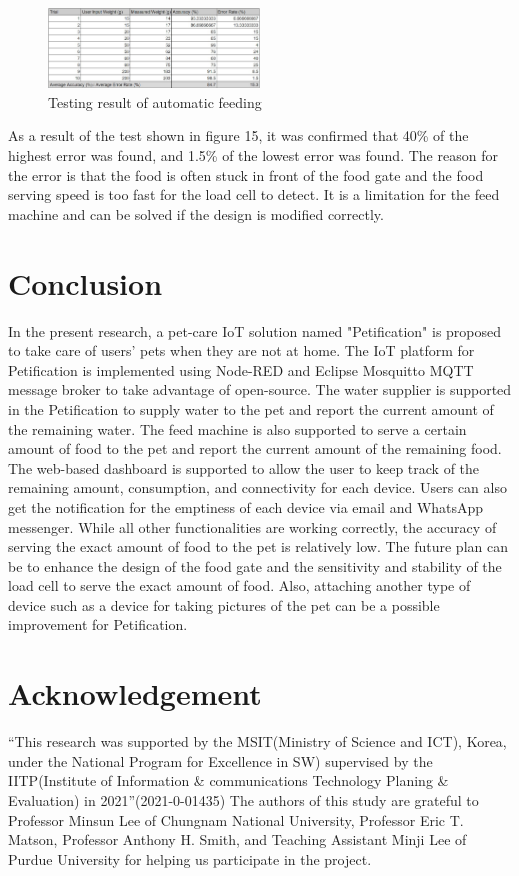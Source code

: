 \documentclass[conference]{IEEEtran}
\begin{document}
\begin{figure}[htbp]
\centerline{\includegraphics[width=0.5\textwidth]{./images/Feeding_sheet.jpg}}
\caption{Testing result of automatic feeding}
\label{fig}
\end{figure}

As a result of the test shown in figure 15, it was confirmed that 40\% of the highest error was found, and 1.5\% of the lowest error was found.
The reason for the error is that the food is often stuck in front of the food gate and the food serving speed is too fast for the load cell to detect.
It is a limitation for the feed machine and can be solved if the design is modified correctly.

\section{Conclusion}
In the present research, a pet-care IoT solution named "Petification" is proposed to take care of users’ pets when they are not at home.
The IoT platform for Petification is implemented using Node-RED and Eclipse Mosquitto MQTT message broker to take advantage of open-source.
The water supplier is supported in the Petification to supply water to the pet and report the current amount of the remaining water.
The feed machine is also supported to serve a certain amount of food to the pet and report the current amount of the remaining food.
The web-based dashboard is supported to allow the user to keep track of the remaining amount, consumption, and connectivity for each device.
Users can also get the notification for the emptiness of each device via email and WhatsApp messenger.
While all other functionalities are working correctly, the accuracy of serving the exact amount of food to the pet is relatively low.
The future plan can be to enhance the design of the food gate and the sensitivity and stability of the load cell to serve the exact amount of food.
Also, attaching another type of device such as a device for taking pictures of the pet can be a possible improvement for Petification.

\section{Acknowledgement}
“This research was supported by the MSIT(Ministry of Science and ICT), Korea, under the National Program for Excellence in SW) supervised by the IITP(Institute of Information \& communications Technology Planing \& Evaluation) in 2021”(2021-0-01435)
The authors of this study are grateful to Professor Minsun Lee of Chungnam National University, Professor Eric T. Matson, Professor Anthony H. Smith, and Teaching Assistant Minji Lee of Purdue University for helping us participate in the project.
\end{document}
